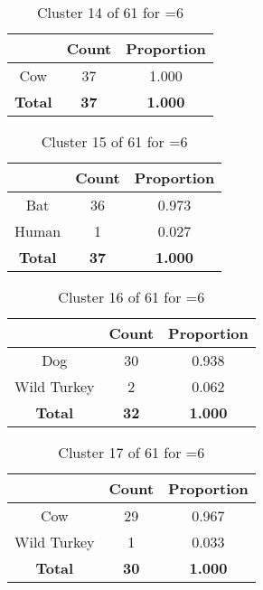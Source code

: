 \begin{table}[ht!]
\centering
\begin{tabular}{|c|c|c|}
\hline
\bf \Spec{} &\bf Count &\bf Proportion\\ \hline \hline
Cow & 37 & 1.000\\ \hline
\hline
\bf Total & \bf 37 & \bf 1.000\\ \hline
\end{tabular}
\label{tab:cluster:14:6}
\caption{Cluster 14 of 61 for \minneigh{}=6}
\end{table}

\begin{table}[ht!]
\centering
\begin{tabular}{|c|c|c|}
\hline
\bf \Spec{} &\bf Count &\bf Proportion\\ \hline \hline
Bat & 36 & 0.973\\ \hline
Human & 1 & 0.027\\ \hline
\hline
\bf Total & \bf 37 & \bf 1.000\\ \hline
\end{tabular}
\label{tab:cluster:15:6}
\caption{Cluster 15 of 61 for \minneigh{}=6}
\end{table}

\begin{table}[ht!]
\centering
\begin{tabular}{|c|c|c|}
\hline
\bf \Spec{} &\bf Count &\bf Proportion\\ \hline \hline
Dog & 30 & 0.938\\ \hline
Wild Turkey & 2 & 0.062\\ \hline
\hline
\bf Total & \bf 32 & \bf 1.000\\ \hline
\end{tabular}
\label{tab:cluster:16:6}
\caption{Cluster 16 of 61 for \minneigh{}=6}
\end{table}

\begin{table}[ht!]
\centering
\begin{tabular}{|c|c|c|}
\hline
\bf \Spec{} &\bf Count &\bf Proportion\\ \hline \hline
Cow & 29 & 0.967\\ \hline
Wild Turkey & 1 & 0.033\\ \hline
\hline
\bf Total & \bf 30 & \bf 1.000\\ \hline
\end{tabular}
\label{tab:cluster:17:6}
\caption{Cluster 17 of 61 for \minneigh{}=6}
\end{table}

